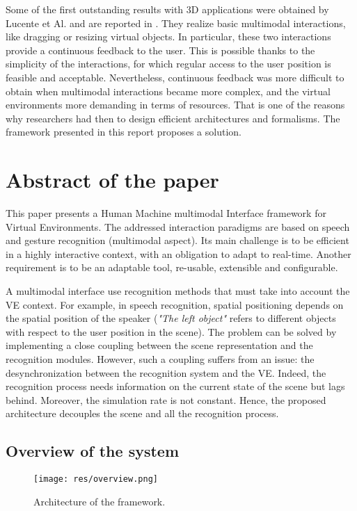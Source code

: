 \documentclass[a4paper]{article}
\begin{document}
Some of the first outstanding results with 3D applications were obtained by Lucente et Al. and are reported in \cite{lucente}. They realize basic multimodal interactions, like dragging or resizing virtual objects. In particular, these two interactions provide a continuous feedback to the user. This is possible thanks to the simplicity of the interactions, for which regular access to the user position is feasible and acceptable. Nevertheless, continuous feedback was more difficult to obtain when multimodal interactions became more complex, and the virtual environments more demanding in terms of resources. That is one of the reasons why researchers had then to design efficient architectures and formalisms. The framework presented in this report proposes a solution.

\section{Abstract of the paper}
\label{sec:abstract}
This paper presents a Human Machine multimodal Interface framework for Virtual Environments. The addressed interaction paradigms are based on speech and gesture recognition (multimodal aspect). Its main challenge is to be efficient in a highly interactive context, with an obligation to adapt to real-time. Another requirement is to be an adaptable tool, re-usable, extensible and configurable.

A multimodal interface use recognition methods that must take into account the VE context. For example, in speech recognition, spatial positioning depends on the spatial position of the speaker (\textit{"The left object"} refers to different objects with respect to the user position in the scene). The problem can be solved by implementing a close coupling between the scene representation and the recognition modules. However, such a coupling suffers from an issue: the desynchronization between the recognition system and the VE. Indeed, the recognition process needs information on the current state of the scene but lags behind. Moreover, the simulation rate is not constant. Hence, the proposed architecture decouples the scene and all the recognition process.

\subsection{Overview of the system}
\label{sec:overview}
\begin{figure}
\centering
\texttt{[image: res/overview.png]}
\caption{\label{fig:overview}Architecture of the framework.}
\end{figure}
\end{document}
